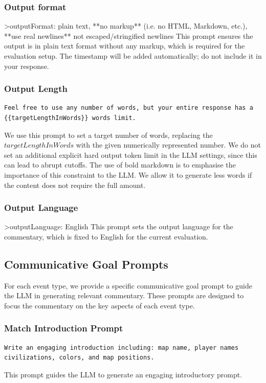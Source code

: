 \subsubsection{Output format}

>outputFormat: plain text, **no markup** (i.e. no HTML, Markdown, etc.), **use real newlines** not escaped/stringified newlines
This prompt ensures the output is in plain text format without any markup, which is required for the evaluation setup. The timestamp will be added automatically; do not include it in your response.

\subsubsection{Output Length}
\begin{verbatim}
Feel free to use any number of words, but your entire response has a
{{targetLengthInWords}} words limit.
\end{verbatim}
We use this prompt to set a target number of words, replacing the $targetLengthInWords$ with the given numerically represented number. We do not set an additional explicit hard output token limit in the LLM settings, since this can lead to abrupt cutoffs. The use of bold markdown is to emphasise the importance of this constraint to the LLM. We allow it to generate less words if the content does not require the full amount.

\subsubsection{Output Language}
>outputLanguage: English
This prompt sets the output language for the commentary, which is fixed to English for the current evaluation.

\subsection{Communicative Goal Prompts}
For each event type, we provide a specific communicative goal prompt to guide the LLM in generating relevant commentary. These prompts are designed to focus the commentary on the key aspects of each event type.

\subsubsection*{Match Introduction Prompt}
\begin{verbatim}
Write an engaging introduction including: map name, player names
civilizations, colors, and map positions.
\end{verbatim}
This prompt guides the LLM to generate an engaging introductory prompt.

